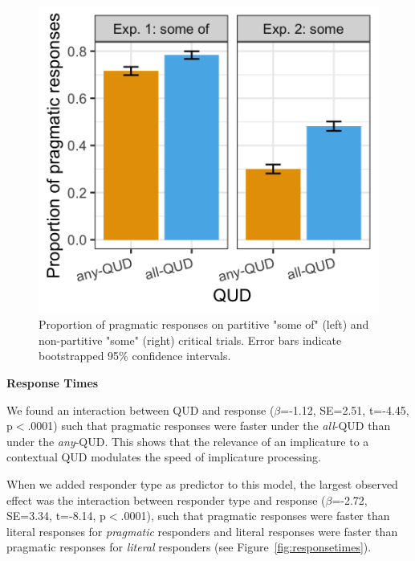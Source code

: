 \documentclass[10pt,letterpaper]{article}
\begin{document}
\begin{figure}
\centering
  \includegraphics[width=.8\columnwidth]{plots/judgements.png}
  \caption{Proportion of pragmatic responses on partitive "some of" (left) and non-partitive "some" (right) critical trials. Error bars indicate bootstrapped 95\% confidence intervals. \label{fig:judgments}}
  \end{figure}
  
\noindent \textbf{Response Times} 

 We found an interaction between QUD and response ($\beta$=-1.12, SE=2.51, t=-4.45, p$<$.0001) such that pragmatic responses were faster under the \textit{all}-QUD than under the \textit{any}-QUD. This shows that the relevance of an implicature to a contextual QUD modulates the speed of implicature processing. 

When we added responder type as predictor to this model, the largest observed effect was the interaction between responder type and response ($\beta$=-2.72, SE=3.34, t=-8.14, p$<$.0001), such that pragmatic responses were faster than literal responses for \emph{pragmatic}  responders and literal responses were faster than pragmatic responses for \emph{literal} responders (see Figure~\ref{fig:responsetimes}).
\end{document}
